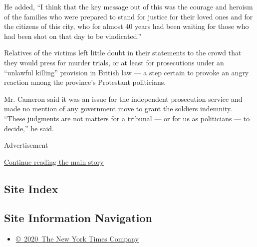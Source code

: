 He added, ``I think that the key message out of this was the courage and
heroism of the families who were prepared to stand for justice for their
loved ones and for the citizens of this city, who for almost 40 years
had been waiting for those who had been shot on that day to be
vindicated.''

Relatives of the victims left little doubt in their statements to the
crowd that they would press for murder trials, or at least for
prosecutions under an ``unlawful killing'' provision in British law ---
a step certain to provoke an angry reaction among the province's
Protestant politicians.

Mr. Cameron said it was an issue for the independent prosecution service
and made no mention of any government move to grant the soldiers
indemnity. ``These judgments are not matters for a tribunal --- or for
us as politicians --- to decide,'' he said.

Advertisement

\protect\hyperlink{after-bottom}{Continue reading the main story}

\hypertarget{site-index}{%
\subsection{Site Index}\label{site-index}}

\hypertarget{site-information-navigation}{%
\subsection{Site Information
Navigation}\label{site-information-navigation}}

\begin{itemize}
\tightlist
\item
  \href{https://help.nytimes.com/hc/en-us/articles/115014792127-Copyright-notice}{©~2020~The
  New York Times Company}
\end{itemize}

